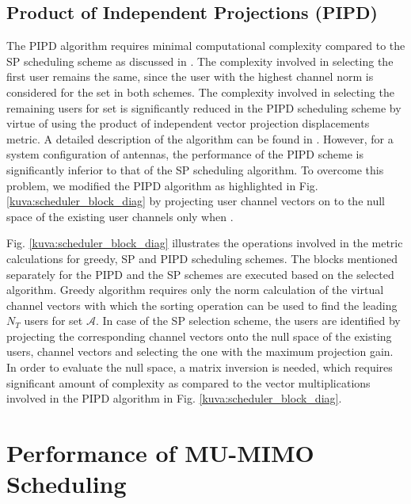 \documentclass[conference,letterpaper,10pt]{./../../IEEE/IEEEtran}
\begin{document}
\subsection{Product of Independent Projections (PIPD)}
The PIPD algorithm requires minimal computational complexity compared to the SP scheduling scheme as discussed in \cite{venkatraman2014low}. The complexity involved in selecting the first user remains the same, since the user with the highest channel norm is considered for the set  in both schemes. The complexity involved in selecting the remaining users for set  is significantly reduced in the PIPD scheduling scheme by virtue of using the product of independent vector projection displacements metric. A detailed description of the algorithm can be found in \cite{venkatraman2014low}. However, for a system configuration of  antennas, the performance of the PIPD scheme is significantly inferior to that of the SP scheduling algorithm. To overcome this problem, we modified the PIPD algorithm as highlighted in Fig. \ref{kuva:scheduler_block_diag} by projecting user channel vectors on to the null space of the existing user channels only when . 

Fig. \ref{kuva:scheduler_block_diag} illustrates the operations involved in the metric calculations for greedy, SP and PIPD scheduling schemes. The blocks mentioned separately for the PIPD and the SP schemes are executed based on the selected algorithm. Greedy algorithm requires only the norm calculation of the virtual channel vectors with which the sorting operation can be used to find the leading $N_T$ users for set $\mathcal{A}$. In case of the SP selection scheme, the users are identified by projecting the corresponding channel vectors onto the null space of the existing users, channel vectors and selecting the one with the maximum projection gain. In order to evaluate the null space, a matrix inversion is needed, which requires significant amount of complexity as compared to the vector multiplications involved in the PIPD algorithm in Fig. \ref{kuva:scheduler_block_diag}.

\section{Performance of MU-MIMO Scheduling}
\label{sec:perf_scheduling}
\end{document}
